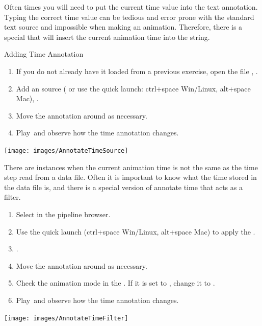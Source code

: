 Often times you will need to put the current time value into the text
annotation.  Typing the correct time value can be tedious and error prone
with the standard text source and impossible when making an animation.
Therefore, there is a special  that will
insert the current animation time into the string.


\begin{exercise}{Adding Time Annotation}
  \label{ex:AddingTimeAnnotation}%
  \begin{enumerate}
  \item If you do not already have it loaded from a previous exercise, open
    the file , \apply.
  \item Add an  source ( \ra {} or use the quick launch: ctrl+space Win/Linux, alt+space Mac), \apply.
  \item Move the annotation around as necessary.
  \item Play~\vcrPlay and observe how the time annotation changes.
    \savecounter
  \end{enumerate}

  \begin{inlinefig}
    \texttt{[image: images/AnnotateTimeSource]}
  \end{inlinefig}

  There are instances when the current animation time is not the same as
  the time step read from a data file.  Often it is important to know what
  the time stored in the data file is, and there is a special version of
  annotate time that acts as a filter.


  \begin{enumerate}
    \restorecounter
  \item Select  in the pipeline browser.
  \item Use the quick launch (ctrl+space Win/Linux, alt+space Mac) to apply
    the . 
  \item \apply.
  \item Move the annotation around as necessary.
  \item Check the animation mode in the .  If it is set
    to , change it to .
  \item Play~\vcrPlay and observe how the time annotation changes.
  \end{enumerate}

  \begin{inlinefig}
    \texttt{[image: images/AnnotateTimeFilter]}
  \end{inlinefig}
\end{exercise}

